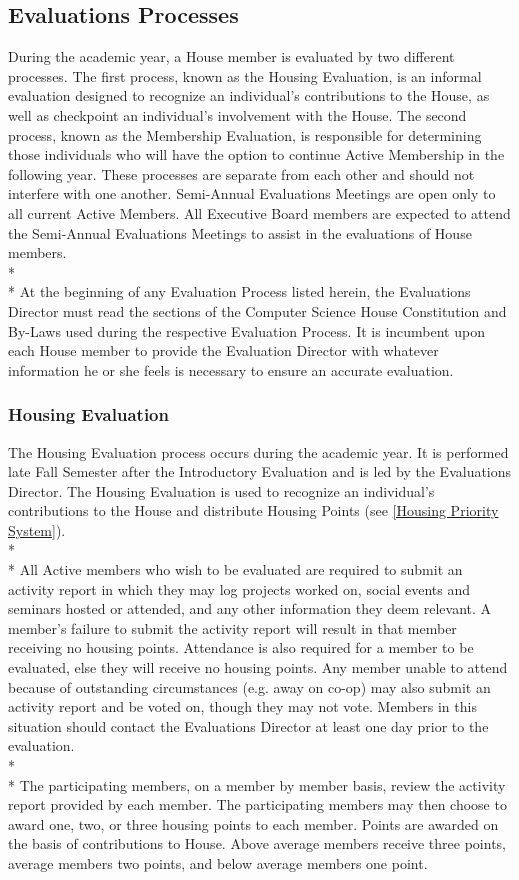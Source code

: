 \documentclass{article}
\newcommand{\bsection}[1]{\subsection{#1} \label{#1}}
\newcommand{\bsubsection}[1]{\subsubsection{#1} \label{#1}}
\begin{document}
\bsection{Evaluations Processes}
During the academic year, a House member is evaluated by two different processes. The first process, known as the Housing Evaluation, is an informal evaluation designed to recognize an individual's contributions to the House, as well as checkpoint an individual's involvement with the House. The second process, known as the Membership Evaluation, is responsible for determining those individuals who will have the option to continue Active Membership in the following year. These processes are separate from each other and should not interfere with one another. Semi-Annual Evaluations Meetings are open only to all current Active Members. All Executive Board members are expected to attend the Semi-Annual Evaluations Meetings to assist in the evaluations of House members.
\\* \\*
At the beginning of any Evaluation Process listed herein, the Evaluations Director must read the sections of the Computer Science House Constitution and By-Laws used during the respective Evaluation Process. It is incumbent upon each House member to provide the Evaluation Director with whatever information he or she feels is necessary to ensure an accurate evaluation.
\bsubsection{Housing Evaluation}
The Housing Evaluation process occurs during the academic year. It is performed late Fall Semester after the Introductory Evaluation and is led by the Evaluations Director. The Housing Evaluation is used to recognize an individual’s contributions to the House and distribute Housing Points (see \ref{Housing Priority System}).
\\* \\*
All Active members who wish to be evaluated are required to submit an activity report in which they may log projects worked on, social events and seminars hosted or attended, and any other information they deem relevant. A member’s failure to submit the activity report will result in that member receiving no housing points. Attendance is also required for a member to be evaluated, else they will receive no housing points. Any member unable to attend because of outstanding circumstances (e.g. away on co-op) may also submit an activity report and be voted on, though they may not vote. Members in this situation should contact the Evaluations Director at least one day prior to the evaluation.
\\* \\*
The participating members, on a member by member basis, review the activity report provided by each member. The participating members may then choose to award one, two, or three housing points to each member. Points are awarded on the basis of contributions to House. Above average members receive three points, average members two points, and below average members one point.
\end{document}
